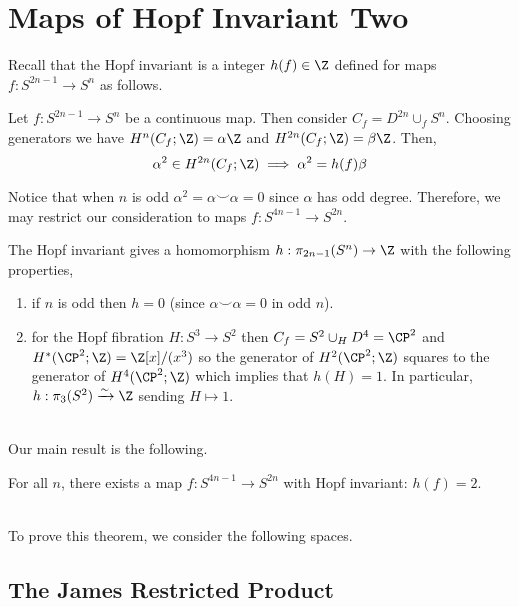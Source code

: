 \documentclass[12pt]{extarticle}
\begin{document}

\section{Maps of Hopf Invariant Two}

Recall that the Hopf invariant is a integer $h(f) \in \Z$ defined for maps $f : S^{2n - 1} \to S^n$ as follows.

\begin{defn}
Let $f : S^{2n - 1} \to S^n$ be a continuous map. Then consider $C_f = D^{2n} \cup_f S^n$. Choosing generators we have $H^n(C_f ; \Z) = \alpha \Z$ and $H^{2n}(C_f; \Z) = \beta \Z$. Then,
\[ \alpha^2 \in H^{2n}(C_f ; \Z) \implies \alpha^2 = h(f) \beta \] 
\end{defn} 

\begin{rmk}
Notice that when $n$ is odd $\alpha^2 = \alpha \smile \alpha = 0$ since $\alpha$ has odd degree. Therefore, we may restrict our consideration to maps $f : S^{4n - 1} \to S^{2n}$. 
\end{rmk}

\begin{prop}
The Hopf invariant gives a homomorphism $h : \pi_{2n - 1}(S^n) \to \Z$ with the following properties,
\begin{enumerate}
\item if $n$ is odd then $h = 0$ (since $\alpha \smile \alpha = 0$ in odd $n$).
\item for the Hopf fibration $H : S^3 \to S^2$ then $C_f = S^2 \cup_H D^4 = \CP^2$ and $H^*(\CP^2; \Z) = \Z[x]/(x^3)$ so the generator of $H^2(\CP^2; \Z)$ squares to the generator of $H^4(\CP^2; \Z)$ which implies that $h(H) = 1$. In particular, $h : \pi_3(S^2) \xrightarrow{\sim} \Z$ sending $H \mapsto 1$. 
\end{enumerate}
\end{prop}
\noindent\\
Our main result is the following.

\begin{theorem}
For all $n$, there exists a map $f : S^{4n - 1} \to S^{2n}$ with Hopf invariant: $h(f) = 2$. 
\end{theorem}
\noindent\\
To prove this theorem, we consider the following spaces.

\subsection{The James Restricted Product}
\end{document}
